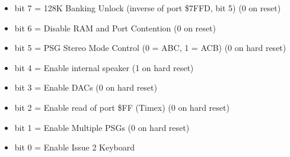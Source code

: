 \begin{itemize}
\item bit 7 = 128K Banking Unlock (inverse of port \$7FFD, bit 5) (0
  on reset)
\item bit 6 = Disable RAM and Port Contention (0 on reset)
\item bit 5 = PSG Stereo Mode Control (0 = ABC, 1 = ACB) (0 on hard
  reset)
\item bit 4 = Enable internal speaker (1 on hard reset)
\item bit 3 = Enable DACs (0 on hard reset)
\item bit 2 = Enable read of port \$FF (Timex) (0 on hard reset)
\item bit 1 = Enable Multiple PSGs (0 on hard reset)
\item bit 0 = Enable Issue 2 Keyboard
\end{itemize}

